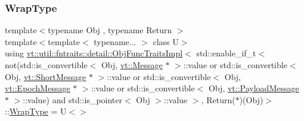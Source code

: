 \subsubsection{\texorpdfstring{Wrap\+Type}{WrapType}}
{\footnotesize\ttfamily template$<$typename Obj , typename Return $>$ \\
template$<$template$<$ typename... $>$ class U$>$ \\
using \hyperlink{structvt_1_1util_1_1fntraits_1_1detail_1_1_obj_func_traits_impl}{vt\+::util\+::fntraits\+::detail\+::\+Obj\+Func\+Traits\+Impl}$<$ std\+::enable\+\_\+if\+\_\+t$<$ not(std\+::is\+\_\+convertible$<$ Obj, \hyperlink{namespacevt_a3a3ddfef40b4c90915fa43cdd5f129ea}{vt\+::\+Message} $\ast$ $>$\+::value or std\+::is\+\_\+convertible$<$ Obj, \hyperlink{namespacevt_a1125ac1da6c0bbf141e0ea0739d7602d}{vt\+::\+Short\+Message} $\ast$ $>$\+::value or std\+::is\+\_\+convertible$<$ Obj, \hyperlink{namespacevt_ad67368ffae52d7325002586b41bb150e}{vt\+::\+Epoch\+Message} $\ast$ $>$\+::value or std\+::is\+\_\+convertible$<$ Obj, \hyperlink{namespacevt_a89a92229c5622b855c02c549f83a1a68}{vt\+::\+Payload\+Message} $\ast$ $>$\+::value) and std\+::is\+\_\+pointer$<$ Obj $>$\+::value $>$, Return($\ast$)(Obj)$>$\+::\hyperlink{structvt_1_1util_1_1fntraits_1_1detail_1_1_obj_func_traits_impl_3_01std_1_1enable__if__t_3_01not8a3cf894b8afc41bf28f29f3b0ac693f_a8c54bb1de61b041a1d0c6c509b89d33c}{Wrap\+Type} =  U$<$$>$}



